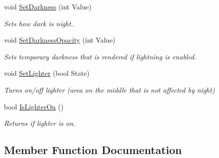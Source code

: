 \begin{DoxyCompactItemize}
\mbox{\label{classtfp_1_1specialeffects_1_1_night_ae6bc6a73197bea6bf34ecf80145194f5}} 
void \mbox{\hyperlink{classtfp_1_1specialeffects_1_1_night_ae6bc6a73197bea6bf34ecf80145194f5}{Set\+Darkness}} (int Value)
\begin{DoxyCompactList}\small\item\em Sets how dark is night. \end{DoxyCompactList}\item 
\mbox{\label{classtfp_1_1specialeffects_1_1_night_a50cfa54522d03b0e2dc2fb111ac2dfd2}} 
void \mbox{\hyperlink{classtfp_1_1specialeffects_1_1_night_a50cfa54522d03b0e2dc2fb111ac2dfd2}{Set\+Darkness\+Opacity}} (int Value)
\begin{DoxyCompactList}\small\item\em Sets temporary darkness that is rendered if lightning is enabled. \end{DoxyCompactList}\item 
\mbox{\label{classtfp_1_1specialeffects_1_1_night_a7926d8c9965454d69ce1d235a9fca941}} 
void \mbox{\hyperlink{classtfp_1_1specialeffects_1_1_night_a7926d8c9965454d69ce1d235a9fca941}{Set\+Lighter}} (bool State)
\begin{DoxyCompactList}\small\item\em Turns on/off lighter (area on the middle that is not affected by night) \end{DoxyCompactList}\item 
\mbox{\label{classtfp_1_1specialeffects_1_1_night_ad26fc86c16eba1803624be2c52dce3d5}} 
bool \mbox{\hyperlink{classtfp_1_1specialeffects_1_1_night_ad26fc86c16eba1803624be2c52dce3d5}{Is\+Lighter\+On}} ()
\begin{DoxyCompactList}\small\item\em Returns if lighter is on. \end{DoxyCompactList}\end{DoxyCompactItemize}


\subsection{Member Function Documentation}
\mbox{\label{classtfp_1_1specialeffects_1_1_night_acf90989e3e036bd3c45a8096809a31a5}} 
